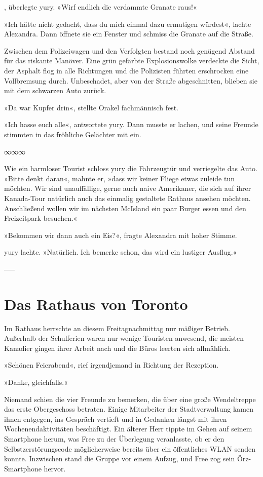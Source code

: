 , überlegte yury. »Wirf endlich die verdammte Granate raus!«

»Ich hätte nicht gedacht, dass du mich einmal dazu ermutigen würdest«, lachte Alexandra. Dann öffnete sie ein Fenster und schmiss die Granate auf die Straße.

Zwischen dem Polizeiwagen und den Verfolgten bestand noch genügend Abstand für das riskante Manöver. Eine grün gefärbte Explosionswolke verdeckte die Sicht, der Asphalt flog in alle Richtungen und die Polizisten führten erschrocken eine Vollbremsung durch. Unbeschadet, aber von der Straße abgeschnitten, blieben sie mit dem schwarzen Auto zurück.

»Da war Kupfer drin«, stellte Orakel fachmännisch fest.

»Ich hasse euch alle«, antwortete yury. Dann musste er lachen, und seine Freunde stimmten in das fröhliche Gelächter mit ein.

\begin{center}
	∞∞∞
\end{center}

Wie ein harmloser Tourist schloss yury die Fahrzeugtür und verriegelte das Auto. »Bitte denkt daran«, mahnte er, »dass wir keiner Fliege etwas zuleide tun möchten. Wir sind unauffällige, gerne auch naive Amerikaner, die sich auf ihrer Kanada-Tour natürlich auch das einmalig gestaltete Rathaus ansehen möchten. Anschließend wollen wir im nächsten McIsland ein paar Burger essen und den Freizeitpark besuchen.«

»Bekommen wir dann auch ein Eis?«, fragte Alexandra mit hoher Stimme.

yury lachte. »Natürlich. Ich bemerke schon, das wird ein lustiger Ausflug.«

-----

\chapter{Das Rathaus von Toronto}

Im Rathaus herrschte an diesem Freitagnachmittag nur mäßiger Betrieb. Außerhalb der Schulferien waren nur wenige Touristen anwesend, die meisten Kanadier gingen ihrer Arbeit nach und die Büros leerten sich allmählich.

»Schönen Feierabend«, rief irgendjemand in Richtung der Rezeption.

»Danke, gleichfalls.«

Niemand schien die vier Freunde zu bemerken, die über eine große Wendeltreppe das erste Obergeschoss betraten. Einige Mitarbeiter der Stadtverwaltung kamen ihnen entgegen, ins Gespräch vertieft und in Gedanken längst mit ihren Wochenendaktivitäten beschäftigt. Ein älterer Herr tippte im Gehen auf seinem Smartphone herum, was Free zu der Überlegung veranlasste, ob er den Selbstzerstörungscode möglicherweise bereits über ein öffentliches WLAN senden konnte. Inzwischen stand die Gruppe vor einem Aufzug, und Free zog sein Örz-Smartphone hervor.


